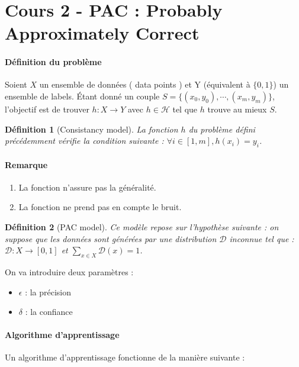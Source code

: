 \documentclass{article}
\newtheorem{definition}{Définition}
\begin{document}
\section{Cours 2 - PAC : Probably Approximately Correct}

\paragraph{Définition du problème} Soient $X$ un ensemble de données (\og{} data points \fg) et Y (équivalent à $\{0, 1\}$) un ensemble de labels. \'Etant donné un couple $S = \{(x_0, y_0), \cdots , (x_m, y_m)\}$, l'objectif est de trouver $h : X \to Y$ avec $h \in \mathcal{H}$ tel que $h$ trouve au mieux $S$.

\begin{definition}[Consistancy model]
  La fonction $h$ du problème défini précédemment vérifie la condition suivante : $\forall i \in [1, m], h(x_i) = y_i$.
\end{definition}

\paragraph{Remarque}
  \begin{enumerate}
    \item La fonction n'assure pas la généralité.
    \item La fonction ne prend pas en compte le bruit.
  \end{enumerate}

\begin{definition}[PAC model]
  Ce modèle repose sur l'hypothèse suivante : on suppose que les données sont générées par une distribution $\mathcal{D}$ inconnue tel que : $\mathcal{D} : X \longrightarrow [0, 1]$ et $\sum_{x \in X} \mathcal{D}(x) = 1$.
\end{definition}


On va introduire deux paramètres :

\begin{itemize}
  \item $\epsilon$ : la précision
  \item $\delta$ : la confiance
\end{itemize}

\paragraph{Algorithme d'apprentissage}
Un algorithme d'apprentissage fonctionne de la manière suivante :
\end{document}

